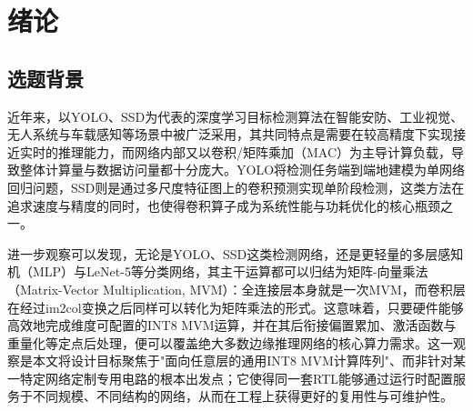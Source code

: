 \documentclass[bachelor,compact,nofont]{xjtuthesis}
\numberwithin{equation}{chapter}
\begin{document}
\xjtuchead
\clearpage
\phantom{x}
\thispagestyle{empty}
\clearpage
\setcounter{page}{1}
\xjtucinfopage
\xjtueinfopage
\xjtutoc
\clearpage

\xjtucontent

\chapter{绪论}

\section{选题背景}

近年来，以YOLO\cite{10}、SSD\cite{11}为代表的深度学习目标检测算法在智能安防、工业视觉、无人系统与车载感知等场景中被广泛采用，其共同特点是需要在较高精度下实现接近实时的推理能力，而网络内部又以卷积/矩阵乘加（MAC）为主导计算负载，导致整体计算量与数据访问量都十分庞大。YOLO将检测任务端到端地建模为单网络回归问题，SSD则是通过多尺度特征图上的卷积预测实现单阶段检测，这类方法在追求速度与精度的同时，也使得卷积算子成为系统性能与功耗优化的核心瓶颈之一。

进一步观察可以发现，无论是YOLO、SSD这类检测网络，还是更轻量的多层感知机（MLP）与LeNet-5等分类网络，其主干运算都可以归结为矩阵-向量乘法（Matrix-Vector Multiplication, MVM）：全连接层本身就是一次MVM，而卷积层在经过im2col变换之后同样可以转化为矩阵乘法的形式。这意味着，只要硬件能够高效地完成维度可配置的INT8 MVM运算，并在其后衔接偏置累加、激活函数与重量化等定点后处理，便可以覆盖绝大多数边缘推理网络的核心算力需求。这一观察是本文将设计目标聚焦于"面向任意层的通用INT8 MVM计算阵列"、而非针对某一特定网络定制专用电路的根本出发点；它使得同一套RTL能够通过运行时配置服务于不同规模、不同结构的网络，从而在工程上获得更好的复用性与可维护性。
\end{document}
